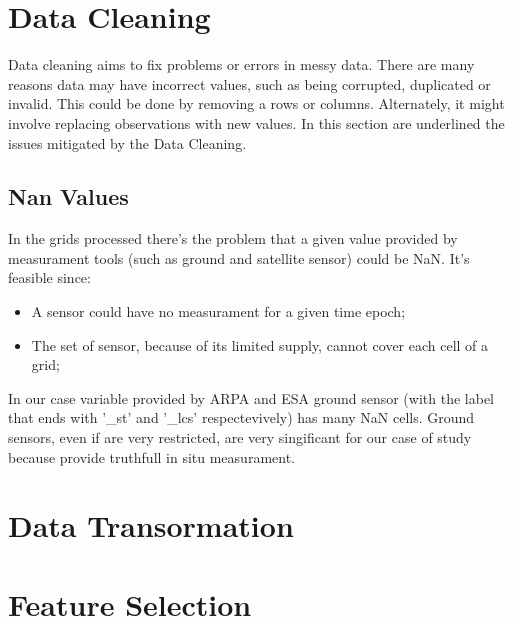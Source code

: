 \section{Data Cleaning}
Data cleaning aims to fix problems or errors in messy data. There are many reasons data may have incorrect values, such as being corrupted, duplicated or invalid. 
This could be done by removing a rows or columns. Alternately, it might involve replacing observations with new values. 
In this section are underlined the issues mitigated by the Data Cleaning.
\subsection{Nan Values}
In the grids processed there's the problem that a given value provided by measurament tools (such as ground and satellite sensor) could be NaN. 
It's feasible since:
\begin{itemize}
\item A sensor could have no measurament for a given time epoch;
\item The set of sensor, because of its limited supply, cannot cover each cell of a grid;
\end{itemize}
In our case variable provided by ARPA and ESA ground sensor (with the label that ends with '\_st' and '\_lcs' respectevively) has many NaN cells. 
Ground sensors, even if are very restricted, are very singificant for our case of study because provide truthfull in situ measurament\cite{usali2010use}.

\section{Data Transormation}
\section{Feature Selection}




